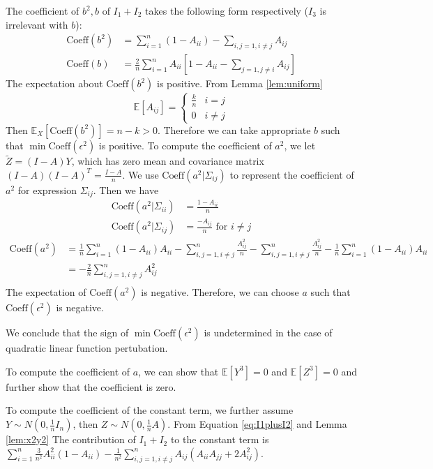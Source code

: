 \documentclass{article}
\def\E{\mathbb{E}}
\begin{document}
The coefficient of $b^2, b$ of $I_1 + I_2$ takes the following form respectively ($I_3$ is irrelevant with $b$):
\begin{align*}
\textrm{Coeff}(b^2) & = \sum_{i=1}^n (1-A_{ii}) - \sum_{i,j=1, i\neq j} A_{ij} \\
\textrm{Coeff}(b) & = \frac{2}{n}\sum_{i=1}^n A_{ii} [ 1 - A_{ii} - \sum_{j=1, j\neq i} A_{ij} ]
\end{align*}
The expectation about $\textrm{Coeff}(b^2)$ is positive. From Lemma \ref{lem:uniform}
$$
\E[A_{ij}]= \begin{cases}
\frac{k}{n} & i = j\\
0 & i\neq j 
\end{cases}
$$
Then $\E_X[\textrm{Coeff}(b^2)]  = n-k > 0$. 
Therefore we can take appropriate $b$ such that $\min \textrm{Coeff}(\epsilon^2)$ is positive.
To compute the coefficient of $a^2$, we let $\widetilde{Z}=(I-A)Y$, which has zero mean and covariance matrix $(I-A)(I-A)^T = \frac{I-A}{n}$.  We use $\textrm{Coeff}(a^2 | \Sigma_{ij})$ to represent the coefficient of $a^2$ for expression $\Sigma_{ij}$. Then  we have
\begin{align*}
\textrm{Coeff}(a^2 | \Sigma_{ii}) & = \frac{1-A_{ii}}{n} \\
\textrm{Coeff}(a^2 | \Sigma_{ij}) & = \frac{-A_{ij}}{n}  \textrm{ for } i \neq j
\end{align*}
\begin{align*}
\textrm{Coeff}(a^2) & = \frac{1}{n}\sum_{i=1}^n (1-A_{ii})A_{ii}  - \sum_{i,j=1, i\neq j}^n \frac{A_{ij}^2}{n} - \sum_{i,j=1, i \neq j}^n \frac{A^2_{ij}}{n} - \frac{1}{n}\sum_{i=1}^n (1-A_{ii})A_{ii} \\
& = -\frac{2}{n} \sum_{i,j=1, i\neq j }^n A^2_{ij} \\
\end{align*}
The expectation of $\textrm{Coeff}(a^2)$ is negative. Therefore, we can choose $a$ such that $\textrm{Coeff}(\epsilon^2)$ is negative.

We conclude that the sign of $\min \textrm{Coeff}(\epsilon^2)$ is undetermined in the case of quadratic linear function pertubation.

To compute the coefficient of $a$, we can show that $\E[Y^3]=0$  and $\E[Z^3]=0$ and further show that the coefficient is zero.

To compute the coefficient of the constant term, we further assume $Y \sim N(0, \frac{1}{n}I_n)$, then $Z \sim N(0, \frac{1}{n}A)$. From Equation \eqref{eq:I1plusI2} and Lemma \ref{lem:x2y2} The contribution of $I_1+ I_2$ to the constant term is 
$ \sum_{i=1}^ n \frac{3}{n^2} A_{ii}^2 (1-A_{ii}) - \frac{1}{n^2} \sum_{i,j=1, i\neq j}^n A_{ij}(A_{ii}A_{jj}+2A_{ij}^2)$.
\end{document}
